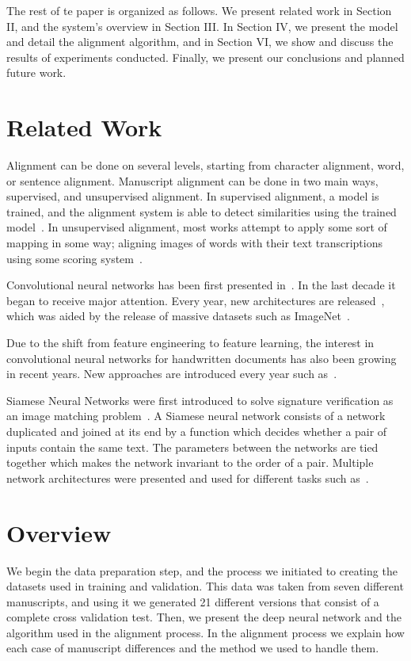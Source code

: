 \documentclass[10pt, a4paper, conference, compsocconf]{IEEEtran}
\begin{document}
The rest of te paper is organized as follows. We present related work in Section II, and the system's overview in Section III. In Section IV, we present the model and detail the alignment algorithm, and in Section VI, we show and discuss the results of experiments conducted. Finally, we present our conclusions and planned future work.
\section{Related Work}%
Alignment can be done on several levels, starting from character alignment, word, or sentence alignment. Manuscript alignment can be done in two main ways, supervised, and unsupervised alignment. In supervised alignment, a model is trained, and the alignment system is able to detect similarities using the trained model~\cite{fischer2011transcription, yin2013transcript}. In unsupervised alignment, most works attempt to apply some sort of mapping in some way; aligning images of words with their text transcriptions using some scoring system~\cite{zinger2009text, stamatopoulos2010efficient, stamatopoulos2014novel}. 

Convolutional neural networks has been first presented in~\cite{NIPS1989_293}. In the last decade it began to receive major attention. Every year, new architectures are released~\cite{krizhevsky2012imagenet, zeiler2014visualizing, simonyan2014two, szegedy2017inception}, which was aided by the release of massive datasets such as ImageNet~\cite{russakovsky2015imagenet}.

Due to the shift from feature engineering to feature learning, the interest in convolutional neural networks for handwritten documents has also been growing in recent years. New approaches are introduced every year such as~\cite{sharma2015adapting, jaderberg2014deep, sudholt2016phocnet}.

Siamese Neural Networks were first introduced to solve signature verification as an image matching problem~\cite{bromley1993signature}. A Siamese neural network consists of a network duplicated and joined at its end by a function which decides whether a pair of inputs contain the same text. The parameters between the networks are tied together which makes the network invariant to the order of a pair. Multiple network architectures were presented and used for different tasks such as~\cite{chopra2005learning, koch2015siamese, bertinetto2016fully}.
\section{Overview}
We begin the data preparation step, and the process we initiated to creating the datasets used in training and validation. This data was taken from seven different manuscripts, and using it we generated 21 different versions that consist of a complete cross validation test. Then, we present the deep neural network and the algorithm used in the alignment process. In the alignment process we explain how each case of manuscript differences and the method we used to handle them.
\end{document}
